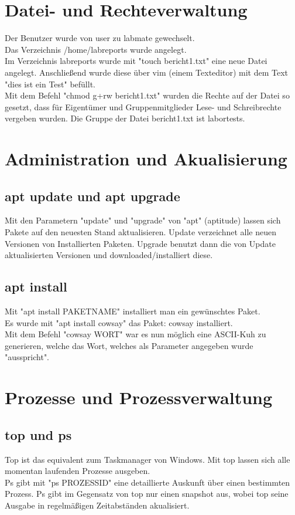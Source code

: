 \documentclass[12pt]{article}
\theoremstyle{plain}
\begin{document}
\section{Datei- und Rechteverwaltung}
Der Benutzer wurde von user zu labmate gewechselt. \\
Das Verzeichnis /home/labreports wurde angelegt. \\
Im Verzeichnis labreports wurde mit "touch bericht1.txt" eine neue Datei angelegt. Anschließend wurde diese über vim (einem Texteditor) mit dem Text "dies ist ein Test" befüllt.\\
Mit dem Befehl "chmod g+rw bericht1.txt" wurden die Rechte auf der Datei so gesetzt, dass für Eigentümer und Gruppenmitglieder Lese- und Schreibrechte vergeben wurden. Die Gruppe der Datei bericht1.txt ist labortests.
\section{Administration und Akualisierung}
\subsection{apt update und apt upgrade}
Mit den Parametern "update" und "upgrade" von "apt" (aptitude) lassen sich Pakete auf den neuesten Stand aktualisieren. Update verzeichnet alle neuen Versionen von Installierten Paketen. Upgrade benutzt dann die von Update aktualisierten Versionen und downloaded/installiert diese.
\subsection{apt install}
Mit "apt install PAKETNAME" installiert man ein gewünschtes Paket. \\
Es wurde mit "apt install cowsay" das Paket: cowsay installiert. \\
Mit dem Befehl "cowsay WORT" war es nun möglich eine ASCII-Kuh zu generieren, welche das Wort, welches als Parameter angegeben wurde "ausspricht".
\section{Prozesse und Prozessverwaltung}
\subsection{top und ps}
Top ist das equivalent zum Taskmanager von Windows. Mit top lassen sich alle momentan laufenden Prozesse ausgeben. \\
Ps gibt mit "ps PROZESSID" eine detaillierte Auskunft über einen bestimmten Prozess. Ps gibt im Gegensatz von top nur einen snapshot aus, wobei top seine Ausgabe in regelmäßigen Zeitabständen akualisiert.
\end{document}
